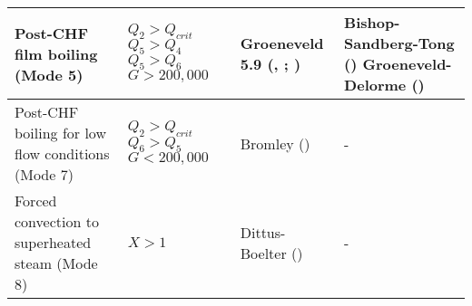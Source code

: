 \begin{ThreePartTable}
\begin{longtable}[c]{L K J J}
        Post-CHF film boiling (Mode 5)                    &  \(Q_{2} > Q_{crit}\) \(Q_{5} > Q_{4}\) \(Q_{5} > Q_{6}\) \(G > 200,000\)            & Groeneveld 5.9 (\cite{ref:Groeneveld1973}, \cite{ref:Groeneveld1978}; \cite{ref:Groeneveld1976})                   &  Bishop-Sandberg-Tong (\cite{ref:Bishop1965}) Groeneveld-Delorme (\cite{ref:Groeneveld1976})          \\   \hline
        Post-CHF boiling for low flow conditions (Mode 7) &  \(Q_{2} > Q_{crit}\) \(Q_{6} > Q_{5}\) \(G < 200,000\)                              & Bromley (\cite{ref:Bromley1950})                                                                                   &  -                                                                                                    \\   \hline
        Forced convection to superheated steam (Mode 8)   &  \(X > 1\)                                                                           & Dittus-Boelter (\cite{ref:Dittus1930a})                                                                            &  -                                                                                                    \\   \hline
    \end{longtable}
\end{ThreePartTable}
